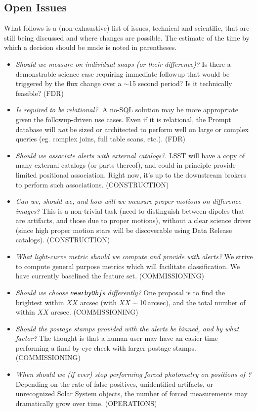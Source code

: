 \documentclass[SE,lsstdraft,toc]{lsstdoc}
\begin{document}
\begin{openissues}
\subsection{Open Issues}

What follows is a (non-exhaustive) list of issues, technical and scientific, that are still being discussed and where changes are possible. The estimate of the time by which a decision should be made is noted in parentheses.

\begin{itemize}
    \item \emph{Should we measure on individual snaps (or their difference)?} Is there a demonstrable science case requiring immediate followup that would be triggered by the flux change over a $\sim$15 second period? Is it technically feasible? (FDR)
    \item \emph{Is \DB required to be relational?}. A no-SQL solution may be more appropriate given the followup-driven use cases. Even if it is relational, the Prompt database will \emph{not} be sized or architected to perform well on large or complex queries (eg. complex joins, full table scans, etc.). (FDR)
    \item \emph{Should we associate alerts with external catalogs?}. LSST will have a copy of many external catalogs (or parts thereof), and could in principle provide limited positional association. Right now, it's up to the downstream brokers to perform such associations. (CONSTRUCTION)
    \item \emph{Can we, should we, and how will we measure proper motions on difference images?} This is a non-trivial task (need to distinguish between dipoles that are artifacts, and those due to proper motions), without a clear science driver (since high proper motion stars will be discoverable using Data Release catalogs). (CONSTRUCTION)
    \item \emph{What light-curve metric should we compute and provide with alerts?} We strive to compute general purpose metrics which will facilitate classification. We have currently baselined the \citet{2011ApJ...733...10R} feature set. (COMMISSIONING)
    \item \emph{Should we choose \texttt{nearbyObj}s differently?} One proposal is to find the brightest \Object within $XX$ arcsec (with $XX \sim$10\,arcsec), and the total number of \Objects within $XX$ arcsec. (COMMISSIONING)
    \item \emph{Should the postage stamps provided with the alerts be binned, and by what factor?} The thought is that a human user may have an easier time performing a final by-eye check with larger postage stamps. (COMMISSIONING)
    \item \emph{When should we (if ever) stop performing forced photometry on positions of \DIAObjects?} Depending on the rate of false positives, unidentified artifacts, or unrecognized Solar System objects, the number of forced measurements may dramatically grow over time. (OPERATIONS)

\end{itemize}
\end{openissues}
\end{document}
